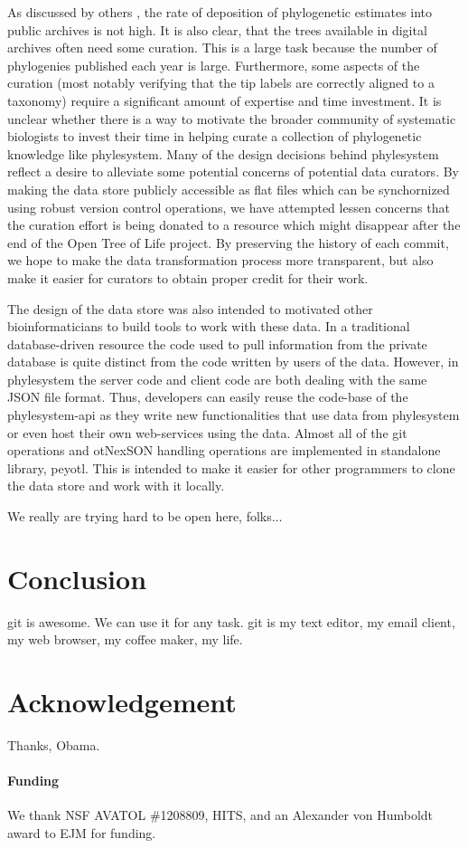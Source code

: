 \documentclass{bioinfo}
\newcommand{\ps}{phylesystem\xspace}
\newcommand{\otol}{Open Tree of Life\xspace}
\newcommand{\nexson}{otNexSON\xspace}
\begin{document}
As discussed by others \citep{DrewEtAl2013,MageeMM2014}, the rate of deposition of phylogenetic
    estimates into public archives is not high.
It is also clear, that the trees available in digital archives often need some curation.
This is a large task because the number of phylogenies published each year is large.
Furthermore, some aspects of the curation (most notably verifying that the tip labels are correctly
    aligned to a taxonomy) require a significant amount of expertise and time investment.
It is unclear whether there is a way to motivate the broader community of systematic biologists to
    invest their time in helping curate a collection of phylogenetic knowledge like \ps.
Many of the design decisions behind \ps reflect a desire to alleviate some potential concerns
    of potential data curators.
By making the data store publicly accessible as flat files which can be synchornized using robust
    version control operations, we have attempted lessen
    concerns that the curation effort is being donated to a resource which might disappear
    after the end of the \otol project.
By preserving the history of each commit, we hope to make the data transformation process more 
    transparent, but also make it easier for curators to obtain proper credit for their work.

The design of the data store was also intended to motivated other bioinformaticians to
    build tools to work with these data.
In a traditional database-driven resource the code used to pull information from the private
    database is quite distinct from the code written by users of the data.
However, in \ps the server code and client code are both dealing with the same JSON file format.
Thus, developers can easily reuse the code-base of the \ps-api as they write new functionalities
    that use data from \ps or even host their own web-services using the data.
Almost all of the git operations and \nexson handling operations are implemented in standalone
    library, peyotl.
This is intended to make it easier for other programmers to clone
    the data store and work with it locally.


We really are trying hard to be open here, folks$\ldots$
\section{Conclusion}
git is awesome.
We can use it for any task.
git is my text editor, my email client, my web browser,
my coffee maker, my life.

\section*{Acknowledgement} Thanks, Obama.

\paragraph{Funding\textcolon} We thank NSF AVATOL \#1208809, HITS, and an Alexander von Humboldt award to EJM for funding.


\end{document}
